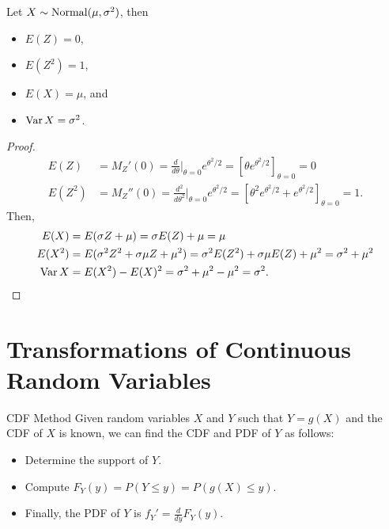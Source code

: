\begin{cor}
    Let $X \sim \mathrm{Normal}(\mu, \sigma^2)$, then
    \begin{itemize}
        \item $E(Z) = 0$,
        \item $E(Z^2) = 1$,
        \item $E(X) = \mu$, and
        \item $\operatorname{Var}{X} = \sigma^2$.
    \end{itemize}
\end{cor}

\begin{proof}
    \begin{align*}
        E(Z) &= M_{Z}'(0) = \frac{d}{d\theta}\big\rvert_{\theta=0}e^{\theta^2/2} = \left[\theta e^{\theta^2/2}\right]_{\theta = 0} = 0 \\
        E(Z^2) &= M_{Z}''(0) = \frac{d^2}{d\theta^2}\big\rvert_{\theta=0}e^{\theta^2/2} = \left[\theta^2 e^{\theta^2/2} + e^{\theta^2/2}\right]_{\theta = 0} = 1.
    \end{align*}
    Then,
    \begin{align*}
        E(X) &= E(\sigma Z + \mu) = \sigma E(Z) + \mu = \mu \\
        E(X^2) &= E(\sigma^2Z^2 + \sigma\mu Z + \mu^2) = \sigma^2E(Z^2) + \sigma\mu E(Z) + \mu^2 = \sigma^2 + \mu^2 \\
        \operatorname{Var}{X} &= E(X^2) - E(X)^2 = \sigma^2 + \mu^2 - \mu^2 = \sigma^2.
    \end{align*}
\end{proof}

\section{Transformations of Continuous Random Variables}

\begin{defn}{CDF Method}\label{cdf-method}\proofbreak
    Given random variables $X$ and $Y$ such that $Y = g(X)$ and the CDF of $X$ is known, we can find the CDF and PDF of $Y$ as follows:
    \begin{itemize}
        \item Determine the support of $Y$.
        \item Compute $F_Y(y) = P(Y \leq y) = P(g(X) \leq y)$.
        \item Finally, the PDF of $Y$ is $f_Y' = \frac{d}{dy}F_Y(y)$.
    \end{itemize}
\end{defn}

